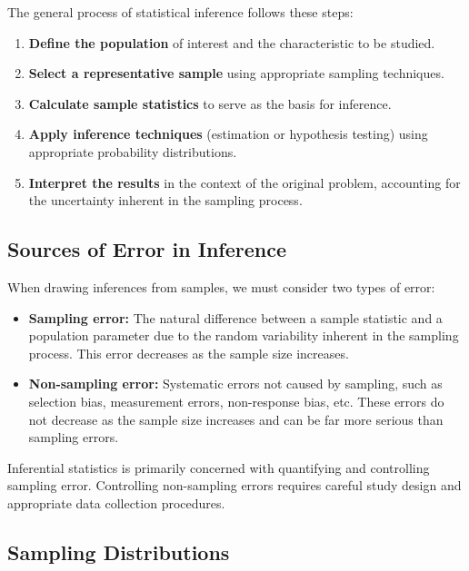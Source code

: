 The general process of statistical inference follows these steps:

\begin{enumerate}
	\item \textbf{Define the population} of interest and the characteristic to be studied.
	\item \textbf{Select a representative sample} using appropriate sampling techniques.
	\item \textbf{Calculate sample statistics} to serve as the basis for inference.
	\item \textbf{Apply inference techniques} (estimation or hypothesis testing) using appropriate probability distributions.
	\item \textbf{Interpret the results} in the context of the original problem, accounting for the uncertainty inherent in the sampling process.
\end{enumerate}

\subsection*{Sources of Error in Inference}

When drawing inferences from samples, we must consider two types of error:

\begin{itemize}
	\item \textbf{Sampling error:} The natural difference between a sample statistic and a population parameter due to the random variability inherent in the sampling process. This error decreases as the sample size increases.
	
	\item \textbf{Non-sampling error:} Systematic errors not caused by sampling, such as selection bias, measurement errors, non-response bias, etc. These errors do not decrease as the sample size increases and can be far more serious than sampling errors.
\end{itemize}

\begin{observacion}
	Inferential statistics is primarily concerned with quantifying and controlling sampling error. Controlling non-sampling errors requires careful study design and appropriate data collection procedures.
\end{observacion}

\subsection*{Sampling Distributions}

